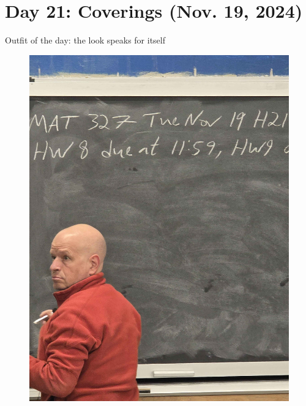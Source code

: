 \section{Day 21: Coverings (Nov. 19, 2024)}
Outfit of the day: the look speaks for itself
\begin{figure}[h]
    \centering
    \includegraphics[scale=0.1]{MAT327 Notes/Dror Shirts/dror day 21 shirt.jpg}
\end{figure}


